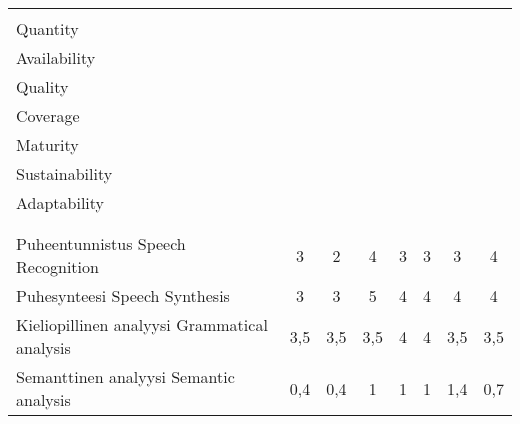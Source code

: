 \documentclass{../../metanetpaper}
\begin{document}
\begin{Parallel}[c]{79mm}{78mm}
 \begin{table}
 \centering
 \begin{tabular}{>{\columncolor[RGB]{255,190,000}}p{.33\linewidth}ccccccc}
 \toprule
 \rowcolor[RGB]{255,190,000}
  \cellcolor{white}&\begin{sideways}\makecell[l]{Määrä \\
Quantity}\end{sideways}
 &\begin{sideways}\makecell[l]{\makecell[l]{Saatavuus \\ Availability}
}\end{sideways} &\begin{sideways}\makecell[l]{Laatu \\ Quality}\end{sideways}
 &\begin{sideways}\makecell[l]{Kattavuus \\ Coverage}\end{sideways}
&\begin{sideways}\makecell[l]{Valmiusaste \\ Maturity}\end{sideways}
&\begin{sideways}\makecell[l]{Vakaus \\ Sustainability}\end{sideways}
&\begin{sideways}\makecell[l]{Soveltuvuus \\ Adaptability}\end{sideways} \\
 \midrule
 \multicolumn{8}{>{\columncolor[RGB]{255,155,000}}l}{Kieliteknologia:
työkalut, teknologiat ja sovellukset} \\\addlinespace[{-.009cm}]
 \multicolumn{8}{>{\columncolor[RGB]{255,155,000}}l}{Language Technology: Tools,
Technologies and Applications} \\
 \midrule
 Puheentunnistus \newline Speech Recognition & 3 & 2 & 4 & 3 & 3 & 3 & 4 \\
 Puhesynteesi \newline Speech Synthesis & 3 & 3 & 5 & 4 & 4 & 4 & 4 \\
 Kieliopillinen analyysi \newline Grammatical analysis
                                     & 3,5 & 3,5 & 3,5 & 4 & 4 & 3,5 & 3,5\\
 Semanttinen analyysi \newline Semantic analysis
                                     & 0,4 & 0,4 & 1 & 1 & 1 & 1,4 & 0,7 \\

\end{tabular}
\end{table}
\end{Parallel}
\end{document}
